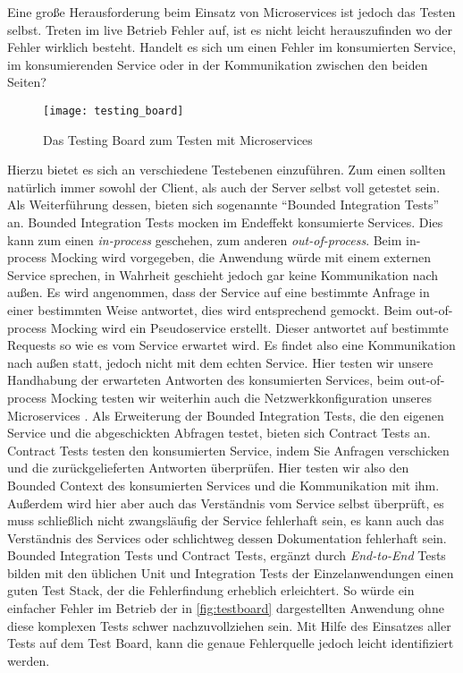 Eine große Herausforderung beim Einsatz von Microservices ist jedoch das Testen selbst. Treten im live Betrieb Fehler auf, ist es nicht leicht herauszufinden wo der Fehler wirklich besteht. Handelt es sich um einen Fehler im konsumierten Service, im konsumierenden Service oder in der Kommunikation zwischen den beiden Seiten?

\begin{wrapfigure}{l}{0.5\textwidth}
    \caption{Das Testing Board zum Testen mit Microservices \cite{rails:soa}}
    \label{fig:testboard}
    \texttt{[image: testing\_board]}
\end{wrapfigure}

Hierzu bietet es sich an verschiedene Testebenen einzuführen. Zum einen sollten natürlich immer sowohl der Client, als auch der Server selbst voll getestet sein. Als Weiterführung dessen, bieten sich sogenannte ``Bounded Integration Tests'' \cite[vgl.][]{rails:soa} an. Bounded Integration Tests mocken im Endeffekt konsumierte Services. Dies kann zum einen \textit{in-process} geschehen, zum anderen \textit{out-of-process}. Beim in-process Mocking wird vorgegeben, die Anwendung würde mit einem externen Service sprechen, in Wahrheit geschieht jedoch gar keine Kommunikation nach außen. Es wird angenommen, dass der Service auf eine bestimmte Anfrage in einer bestimmten Weise antwortet, dies wird entsprechend gemockt. Beim out-of-process Mocking wird ein Pseudoservice erstellt. Dieser antwortet auf bestimmte Requests so wie es vom Service erwartet wird. Es findet also eine Kommunikation nach außen statt, jedoch nicht mit dem echten Service. Hier testen wir unsere Handhabung der erwarteten Antworten des konsumierten Services, beim out-of-process Mocking testen wir weiterhin auch die Netzwerkkonfiguration unseres Microservices \cite{fowler:mstesting}.
Als Erweiterung der Bounded Integration Tests, die den eigenen Service und die abgeschickten Abfragen testet, bieten sich Contract Tests \cite[vgl.][]{fowler:contracts} an. Contract Tests testen den konsumierten Service, indem Sie Anfragen verschicken und die zurückgelieferten Antworten überprüfen. Hier testen wir also den Bounded Context \cite[vgl.][]{fowler:bounded} des konsumierten Services und die Kommunikation mit ihm. Außerdem wird hier aber auch das Verständnis vom Service selbst überprüft, es muss schließlich nicht zwangsläufig der Service fehlerhaft sein, es kann auch das Verständnis des Services oder schlichtweg dessen Dokumentation fehlerhaft sein.
Bounded Integration Tests und Contract Tests, ergänzt durch \textit{End-to-End} Tests bilden mit den üblichen Unit und Integration Tests der Einzelanwendungen einen guten Test Stack, der die Fehlerfindung erheblich erleichtert. So würde ein einfacher Fehler im Betrieb der in \autoref{fig:testboard} dargestellten Anwendung ohne diese komplexen Tests schwer nachzuvollziehen sein. Mit Hilfe des Einsatzes aller Tests auf dem Test Board, kann die genaue Fehlerquelle jedoch leicht identifiziert werden.

